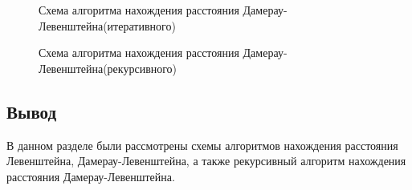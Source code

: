 \documentclass[a4paper,12pt]{report}
\begin{document}
\begin{center}
\begin{figure}[h]
			\caption{Схема алгоритма нахождения расстояния Дамерау-Левенштейна(итеративного)}
			\label{ris:image}
		\end{figure}
        \begin{figure}[h]
			\caption{Схема алгоритма нахождения расстояния Дамерау-Левенштейна(рекурсивного)}
			\label{ris:image}
		\end{figure}
    \end{center}
    
    \begin{flushleft}
    \newpage
\begin{center}
\subsection{Вывод}
	
    	\end{center}    	
    	
	В данном разделе были рассмотрены схемы алгоритмов нахождения расстояния Левенштейна, Дамерау-Левенштейна, а также рекурсивный алгоритм нахождения расстояния Дамерау-Левенштейна.
    \end{flushleft}
\end{document}

